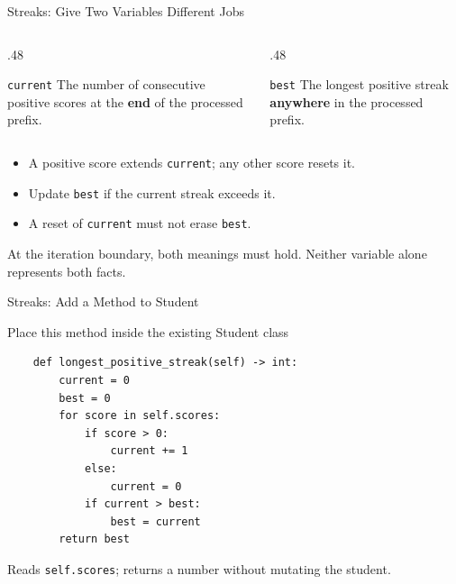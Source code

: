 \documentclass[aspectratio=169,10pt]{beamer}
\begin{document}
\begin{frame}{Streaks: Give Two Variables Different Jobs}
\small
\begin{columns}[T,onlytextwidth]
\begin{column}{.48\textwidth}
\begin{block}{\texttt{current}}
The number of consecutive positive scores at the \textbf{end} of the processed prefix.
\end{block}
\end{column}
\begin{column}{.48\textwidth}
\begin{block}{\texttt{best}}
The longest positive streak \textbf{anywhere} in the processed prefix.
\end{block}
\end{column}
\end{columns}
\begin{itemize}
 \item A positive score extends \texttt{current}; any other score resets it.
 \item Update \texttt{best} if the current streak exceeds it.
 \item A reset of \texttt{current} must not erase \texttt{best}.
\end{itemize}
\begin{keyidea}At the iteration boundary, both meanings must hold. Neither variable alone represents both facts.\end{keyidea}
\end{frame}

\begin{frame}[fragile]{Streaks: Add a Method to Student}
\small
\begin{block}{Place this method inside the existing Student class}
\footnotesize
\begin{verbatim}
    def longest_positive_streak(self) -> int:
        current = 0
        best = 0
        for score in self.scores:
            if score > 0:
                current += 1
            else:
                current = 0
            if current > best:
                best = current
        return best
\end{verbatim}
\end{block}
\begin{keyidea}Reads \texttt{self.scores}; returns a number without mutating the student.\end{keyidea}
\end{frame}
\end{document}
